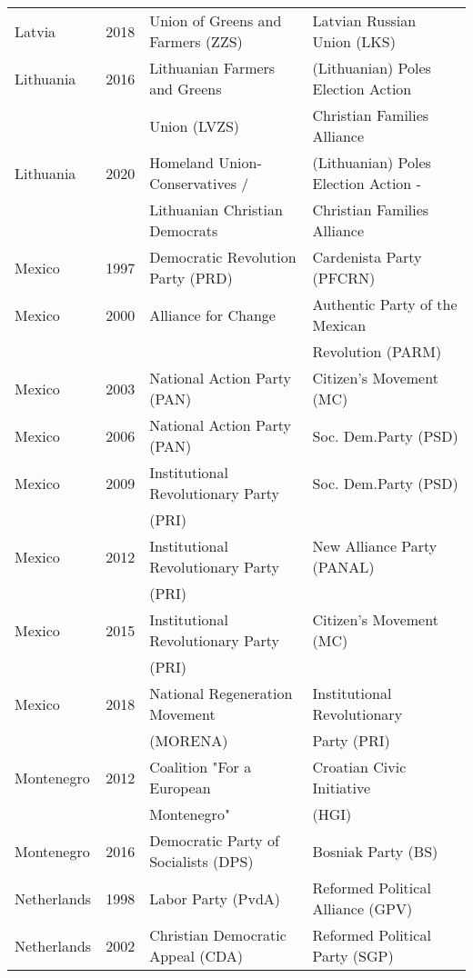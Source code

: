 {\begin{longtable}{|l|c|l|l|}
  Latvia & 2018 &   Union of Greens and Farmers (ZZS)   &   Latvian Russian Union (LKS)   \\ 
  Lithuania & 2016 &   Lithuanian Farmers and Greens  &   (Lithuanian) Poles Election Action  \\ 
         &  &    Union (LVZS) &    Christian Families Alliance  \\ 
  Lithuania & 2020 &   Homeland Union-Conservatives /  &   (Lithuanian) Poles Election Action -   \\ 
    &  &     Lithuanian Christian Democrats &    Christian Families Alliance  \\ 
  Mexico & 1997 &   Democratic Revolution Party (PRD) &   Cardenista Party (PFCRN) \\ 
  Mexico & 2000 &   Alliance for Change   &   Authentic Party of the Mexican  \\ 
               &      &         &  Revolution (PARM)   \\ 
  Mexico & 2003 &   National Action Party (PAN) &   Citizen's Movement (MC)   \\ 
  Mexico & 2006 &   National Action Party (PAN) &        Soc. Dem.Party (PSD)   \\ 
  Mexico & 2009 &   Institutional Revolutionary Party &        Soc. Dem.Party (PSD)   \\ 
               &      &        (PRI)  &     \\ 
  Mexico & 2012 &   Institutional Revolutionary Party &   New Alliance Party (PANAL) \\ 
               &      &        (PRI)  &     \\ 
  Mexico & 2015 &   Institutional Revolutionary Party  &   Citizen's Movement (MC)   \\ 
               &      &    (PRI)     &     \\ 
  Mexico & 2018 &   National Regeneration Movement &   Institutional Revolutionary \\ 
               &      &        (MORENA)  &   Party (PRI)   \\ 
  Montenegro & 2012 &   Coalition "For a European    &   Croatian Civic Initiative \\ 
               &      &        Montenegro" &     (HGI) \\ 
Montenegro & 2016 &   Democratic Party of Socialists (DPS) &   Bosniak Party (BS) \\ 
Netherlands & 1998 &   Labor Party (PvdA) &   Reformed Political Alliance (GPV)  \\ 
Netherlands & 2002 &   Christian Democratic Appeal (CDA)  &   Reformed Political Party (SGP)  \\ 

\end{longtable}}
